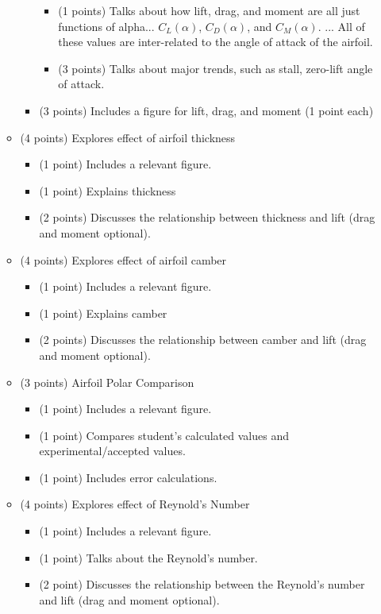 \documentclass[12pt]{article}
\begin{document}
\begin{itemize}
\begin{itemize}
\begin{itemize}
\begin{itemize}
				\item (1 points) Talks about how lift, drag, and moment are all just functions of alpha... $C_L(\alpha)$, $C_D(\alpha)$, and $C_M(\alpha)$. ... All of these values are inter-related to the angle of attack of the airfoil. 
				\item (3 points) Talks about major trends, such as stall, zero-lift angle of attack. 
			\end{itemize}
			\item (3 points) Includes a figure for lift, drag, and moment (1 point each)
		\end{itemize}
		\item (4 points) Explores effect of airfoil thickness
		\begin{itemize}
			\item (1 point) Includes a relevant figure. 
			\item (1 point) Explains thickness
			\item (2 points) Discusses the relationship between thickness and lift (drag and moment optional). 
		\end{itemize}
		\item (4 points) Explores effect of airfoil camber
		\begin{itemize}
			\item (1 point) Includes a relevant figure. 
			\item (1 point) Explains camber
			\item (2 points) Discusses the relationship between camber and lift (drag and moment optional). 
		\end{itemize}
		\item (3 points) Airfoil Polar Comparison
		\begin{itemize}
			\item (1 point) Includes a relevant figure. 
			\item (1 point) Compares student's calculated values and experimental/accepted values.
			\item (1 point) Includes error calculations.
		\end{itemize}
		\item (4 points) Explores effect of Reynold's Number
		\begin{itemize}
			\item (1 point) Includes a relevant figure.
			\item (1 point) Talks about the Reynold's number.
			\item (2 point) Discusses the relationship between the Reynold's number and lift (drag and moment optional).

\end{itemize}
\end{itemize}
\end{itemize}
\end{document}
